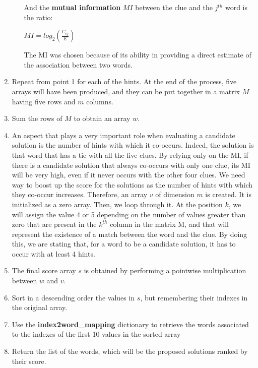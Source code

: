 \documentclass[twoside,twocolumn]{article}
\begin{document}
\begin{enumerate}
\begin{enumerate}
	And the \textbf{mutual information} $MI$ between the clue and the  $j^{th}$ word is the ratio:
	\begin{center}
	$MI = log_2 (\frac{C_{cj}}{E})$
	\end{center}
	The MI was chosen because of its ability in providing a direct estimate of the association between two words.   
	\end{enumerate}
	\item Repeat from point 1 for each of the hints. At the end of the process, five arrays will have been produced, and they can be put together in a matrix $M$ having five rows and $m$ columns. 
	\item Sum the rows of $M$ to obtain an array $w$.
	\item An aspect that plays a very important role when evaluating a candidate solution is the number of hints with which it co-occurs. Indeed, the solution is that word that has a tie with all the five clues. By relying only on the MI, if there is a candidate solution that always co-occurs with only one clue, its MI will be very high, even if it never occurs with the other four clues. We need way to boost up the score for the solutions as the number of hints with which they co-occur increases. Therefore, an array $v$ of dimension $m$ is created. It is initialized as a zero array. Then, we loop through it. At the position $k$, we will assign the value 4 or 5 depending on the number of values greater than zero that are present in the $k^{th}$ column in the matrix M, and that will represent the existence of a match between the word and the clue. By doing this, we are stating that, for a word to be a candidate solution, it has to occur with at least 4 hints.
	\item The final score array $s$ is obtained by performing a pointwise multiplication between $w$ and $v$.
	\item Sort in a descending order the values in $s$, but remembering their indexes in the original array.
	\item Use the \textbf{index2word\_mapping} dictionary to retrieve the words associated to the indexes of the first 10 values in the sorted array
	\item Return the list of the words, which will be the proposed solutions ranked by their score.
	\end{enumerate}
\end{document}
